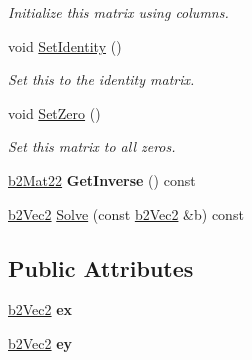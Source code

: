 \begin{DoxyCompactItemize}
\begin{DoxyCompactList}\small\item\em Initialize this matrix using columns. \end{DoxyCompactList}\item 
void \hyperlink{structb2_mat22_a7192f063b771ac9ded060e41df890509}{Set\+Identity} ()\hypertarget{structb2_mat22_a7192f063b771ac9ded060e41df890509}{}\label{structb2_mat22_a7192f063b771ac9ded060e41df890509}

\begin{DoxyCompactList}\small\item\em Set this to the identity matrix. \end{DoxyCompactList}\item 
void \hyperlink{structb2_mat22_aaeae95f61cf3171ffb94703980e3594b}{Set\+Zero} ()\hypertarget{structb2_mat22_aaeae95f61cf3171ffb94703980e3594b}{}\label{structb2_mat22_aaeae95f61cf3171ffb94703980e3594b}

\begin{DoxyCompactList}\small\item\em Set this matrix to all zeros. \end{DoxyCompactList}\item 
\hyperlink{structb2_mat22}{b2\+Mat22} {\bfseries Get\+Inverse} () const \hypertarget{structb2_mat22_af8d14ac8f48feb282cdd669f36ac8070}{}\label{structb2_mat22_af8d14ac8f48feb282cdd669f36ac8070}

\item 
\hyperlink{structb2_vec2}{b2\+Vec2} \hyperlink{structb2_mat22_ab511ad33f5abf87351581842628a9dc3}{Solve} (const \hyperlink{structb2_vec2}{b2\+Vec2} \&b) const 
\end{DoxyCompactItemize}
\subsection*{Public Attributes}
\begin{DoxyCompactItemize}
\item 
\hyperlink{structb2_vec2}{b2\+Vec2} {\bfseries ex}\hypertarget{structb2_mat22_abaffa5fc1d401ea36415acffa6205689}{}\label{structb2_mat22_abaffa5fc1d401ea36415acffa6205689}

\item 
\hyperlink{structb2_vec2}{b2\+Vec2} {\bfseries ey}\hypertarget{structb2_mat22_af19db58941d2cd146325ef3191b776fd}{}\label{structb2_mat22_af19db58941d2cd146325ef3191b776fd}

\end{DoxyCompactItemize}


